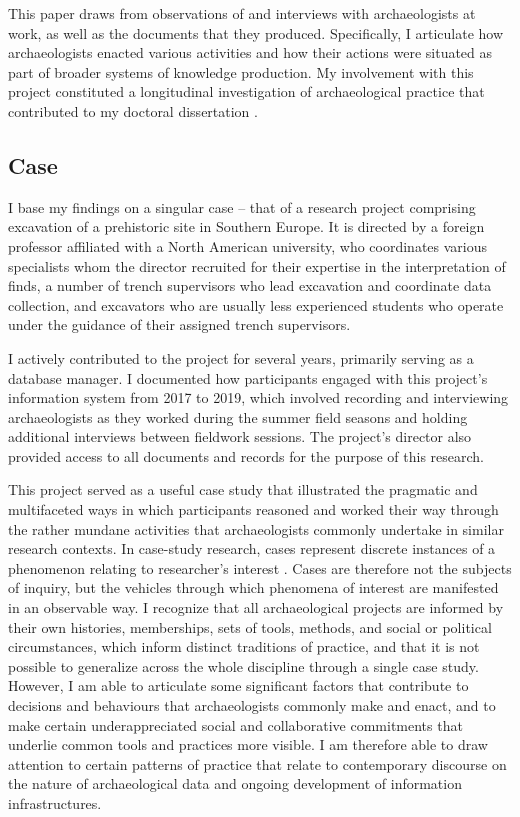 This paper draws from observations of and interviews with archaeologists at work, as well as the documents that they produced.
Specifically, I articulate how archaeologists enacted various activities and how their actions were situated as part of broader systems of knowledge production.
My involvement with this project constituted a longitudinal investigation of archaeological practice that contributed to my doctoral dissertation \parencite[]{batist2023a}.

\subsection*{Case}
I base my findings on a singular case -- that of a research project comprising excavation of a prehistoric site in Southern Europe.
It is directed by a foreign professor affiliated with a North American university, who coordinates various specialists whom the director recruited for their expertise in the interpretation of finds, a number of trench supervisors who lead excavation and coordinate data collection, and excavators who are usually less experienced students who operate under the guidance of their assigned trench supervisors.

I actively contributed to the project for several years, primarily serving as a database manager.
I documented how participants engaged with this project's information system from 2017 to 2019, which involved recording and interviewing archaeologists as they worked during the summer field seasons and holding additional interviews between fieldwork sessions.
The project's director also provided access to all documents and records for the purpose of this research.

This project served as a useful case study that illustrated the pragmatic and multifaceted ways in which participants reasoned and worked their way through the rather mundane activities that archaeologists commonly undertake in similar research contexts.
In case-study research, cases represent discrete instances of a phenomenon relating to researcher's interest \parencite[]{ragin1992}.
Cases are therefore not the subjects of inquiry, but the vehicles through which phenomena of interest are manifested in an observable way.
I recognize that all archaeological projects are informed by their own histories, memberships, sets of tools, methods, and social or political circumstances, which inform distinct traditions of practice, and that it is not possible to generalize across the whole discipline through a single case study.
However, I am able to articulate some significant factors that contribute to decisions and behaviours that archaeologists commonly make and enact, and to make certain underappreciated social and collaborative commitments that underlie common tools and practices more visible.
I am therefore able to draw attention to certain patterns of practice that relate to contemporary discourse on the nature of archaeological data and ongoing development of information infrastructures.

